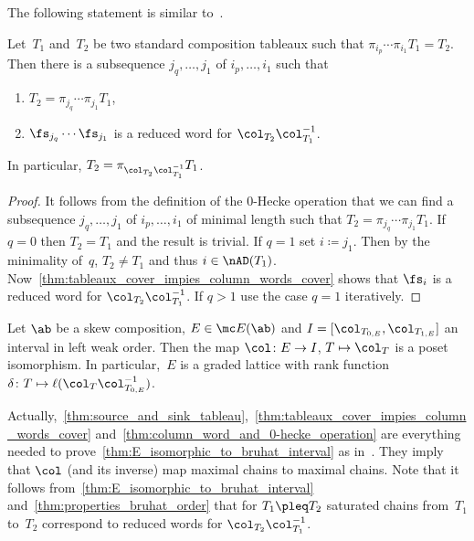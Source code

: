 The following statement is similar to~\cite[Lemma~4.3]{Tewari2015}.
\begin{lemma}
	\label{thm:column_word_and_0-hecke_operation}
	Let~$T_1$ and~$T_2$ be two standard composition tableaux such that $\pi_{i_p} \cdots \pi_{i_1} T_1 = T_2$. Then there is a subsequence $j_q, \ldots, j_1$ of $i_p, \ldots,i_1$ such that
	\begin{enumerate}
		\item
		$T_2 = \pi_{j_q} \cdots \pi_{j_1}T_1$,
		\item 
		$\fs_{j_q} \cdots \fs_{j_1}$ is a reduced word for $\col_{T_2}\col^{-1}_{T_1}$.
	\end{enumerate}
	In particular, $T_2 = \pi_{\col_{T_2}\col^{-1}_{T_1}} T_1$.
\end{lemma}


\begin{proof} It follows from the definition of the 0-Hecke operation that we can find a subsequence $j_q, \ldots, j_1$ of $i_p, \ldots,i_1$ of minimal length such that $T_2 = \pi_{j_q} \cdots \pi_{j_1}T_1$. If~$q=0$ then $T_2 = T_1$ and the result is trivial. If $q=1$ set $i \coloneqq j_1$. Then by the minimality of~$q$, $T_2 \neq T_1$ and thus $i\in \nAD(T_1)$. Now~\cref{thm:tableaux_cover_impies_column_words_cover} shows that $\fs_i$ is a reduced word for $\col_{T_2}\col^{-1}_{T_1}$. If $q>1$ use the case $q=1$ iteratively.
\end{proof}



\begin{thm}
	\label{thm:E_isomorphic_to_bruhat_interval}
	Let $\ab$ be a skew composition, $E\in \mc E(\ab)$ and $I = [\col_{T_{0,E}}, \col_{T_{1,E}}]$ an interval in left weak order. Then the map 
	$\col \colon E\to I$, $T\mapsto\col_T$ is a poset isomorphism. In particular,~$E$ is a graded lattice with rank function $\delta\colon T\mapsto \ell(\col_T \col^{-1}_{T_{0,E}})$.
\end{thm}

Actually,~\cref{thm:source_and_sink_tableau},~\cref{thm:tableaux_cover_impies_column_words_cover} and~\cref{thm:column_word_and_0-hecke_operation} are everything needed to prove~\cref{thm:E_isomorphic_to_bruhat_interval} as in~\cite{Tewari2015}. They imply that $\col$ (and its inverse) map maximal chains to maximal chains.
Note that it follows from~\cref{thm:E_isomorphic_to_bruhat_interval} and~\cref{thm:properties_bruhat_order} that for $T_1 \pleq T_2$ saturated chains from~$T_1$ to~$T_2$ correspond to reduced words for $\col_{T_2}\col^{-1}_{T_1}$.


